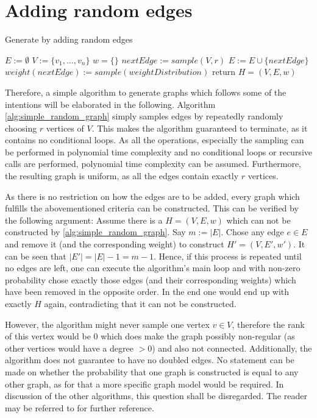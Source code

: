 \section{Adding random edges}
\begin{algorithm}[htpb]
	\caption{Generate by adding random edges\label{alg:simple_random_graph}} 
	\begin{algorithmic}
		\State $E := \emptyset$
		\State $V := \{v_1, \ldots, v_n\}$
		\State $w = \{\}$
		\State $nextEdge := sample(V, r) $
		\State $E := E \cup	 \{nextEdge\}$ %
		\State $weight(nextEdge) := sample(weightDistribution)$ 
		\EndFor
		\State return $H = (V, E, w)$
		\EndFunction 
	\end{algorithmic}
\end{algorithm}	
Therefore, a simple algorithm to generate graphs which follows some of the intentions will be elaborated in the following. Algorithm \ref{alg:simple_random_graph} simply samples edges by repeatedly randomly choosing $r$ vertices of $V$. 
This makes the algorithm guaranteed to terminate, as it contains no conditional loops. As all the operations, especially the sampling can be performed in polynomial time complexity and no conditional loops or recursive calls are performed, polynomial time complexity can be assumed. Furthermore, the resulting graph is uniform, as all the edges contain exactly $r$ vertices. 

As there is no restriction on how the edges are to be added, every graph which fulfills the abovementioned criteria can be constructed. This can be verified by the following argument: Assume there is a $H = (V, E, w)$ which can not be constructed by \cref{alg:simple_random_graph}. Say $m:=|E|$. Chose any edge $e \in E$ and remove it (and the corresponding weight) to construct $H' = (V, E', w')$. It can be seen that $|E'|= |E|-1 = m-1 $. Hence, if this process is repeated until no edges are left, one can execute the algorithm's main loop and with non-zero probability chose exactly those edges (and their corresponding weights) which have been removed in the opposite order. In the end one would end up with exactly $H$ again, contradicting that it can not be constructed.

However, the algorithm might never sample one vertex $v \in V$, therefore the rank of this vertex would be $0$ which does make the graph possibly non-regular (as other vertices would have a degree $>0$) and also not connected. Additionally, the algorithm does not guarantee to have no doubled edges. No statement can be made on whether the probability that one graph is constructed is equal to any other graph, as for that a more specific graph model would be required. In discussion of the other algorithms, this question shall be disregarded. The reader may be referred to \cite{ghoshal2009random} for further reference.

